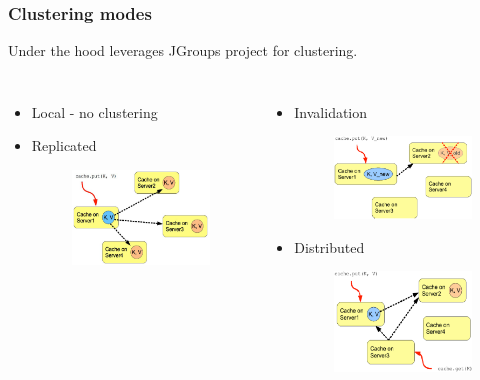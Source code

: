 \documentclass[10pt,utf8]{beamer}
\begin{document}
\begin{frame}
	\frametitle{Clustering modes}
	Under the hood leverages JGroups project for clustering.
	\begin{columns}
		\begin{itemize}
			\item Local - no clustering
			\vspace{3cm}
			\item Replicated
			\begin{figure}
				\includegraphics[width=4cm]{./img/ispn-repl.eps}
			\end{figure}
		\end{itemize}
		\begin{itemize}
			\item Invalidation
			\begin{figure}
				\includegraphics[width=4cm]{./img/ispn-inval.eps}
			\end{figure}
			\item Distributed
			\begin{figure}
				\includegraphics[width=4cm]{./img/ispn-dist.eps}
			\end{figure}
		\end{itemize}
	\end{columns}
\end{frame}
\end{document}
